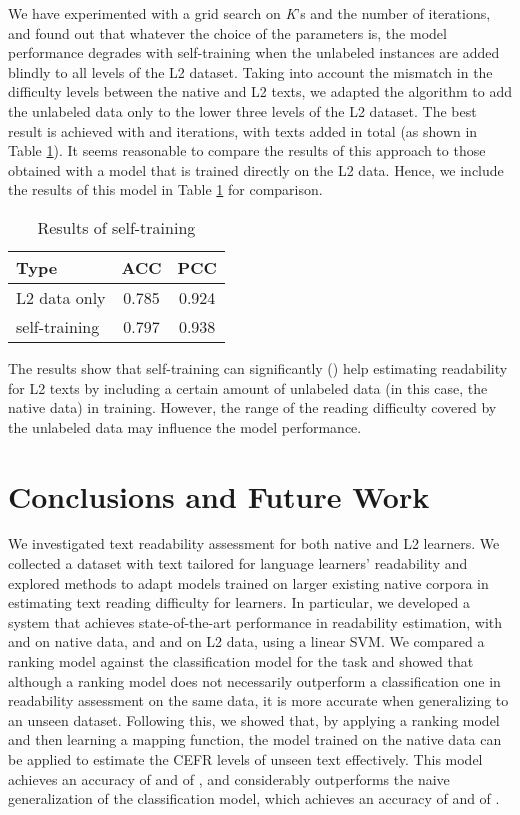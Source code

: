\documentclass[11pt,letterpaper]{article}
\begin{document}
    We have experimented with a grid search on \textit{K}'s and the number of iterations, and found out that whatever the choice of the parameters is, the model performance degrades with self-training when the unlabeled instances are added blindly to all levels of the L2 dataset. Taking into account the mismatch in the difficulty levels between the native and L2 texts, we adapted the algorithm to add the unlabeled data only to the lower three levels of the L2 dataset. The best result is achieved with  and  iterations, with  texts added in total (as shown in Table \ref{st}). It seems reasonable to compare the results of this approach to those obtained with a model that is trained directly on the L2 data. Hence, we include the results of this model in Table \ref{st} for comparison. 
    
        
    	\begin{table}[t]
	\centering
	\small
	\begin{tabular}{l|c|c}
		\hline
		Type & ACC & PCC\\
		\hline \hline
    	L2 data only & 0.785 & 0.924\\ \hline
		self-training & 0.797 & 0.938\\
		\hline
	\end{tabular}
	\caption{Results of self-training}
	\label{st}

    \end{table}
    
    
    The results show that self-training can significantly () help estimating readability for L2 texts by including a certain amount of unlabeled data (in this case, the native data) in training. However, the range of the reading difficulty covered by the unlabeled data may influence the model performance.

\section{Conclusions and Future Work}

    We investigated text readability assessment for both native and L2 learners. We collected a dataset with text tailored for language learners' readability and explored methods to adapt models trained on larger existing native corpora in estimating text reading difficulty for learners. In particular, we developed a system that achieves state-of-the-art performance in readability estimation, with  and  on native data, and  and  on L2 data, using a linear SVM. We compared a ranking model against the classification model for the task and showed that although a ranking model does not necessarily outperform a classification one in readability assessment on the same data, it is more accurate when generalizing to an unseen dataset. Following this, we showed that, by applying a ranking model and then learning a mapping function, the model trained on the native data can be applied to estimate the CEFR levels of unseen text effectively. This model achieves an accuracy of  and  of , and considerably outperforms the naive generalization of the classification model, which achieves an accuracy of  and  of . 
    
\end{document}
